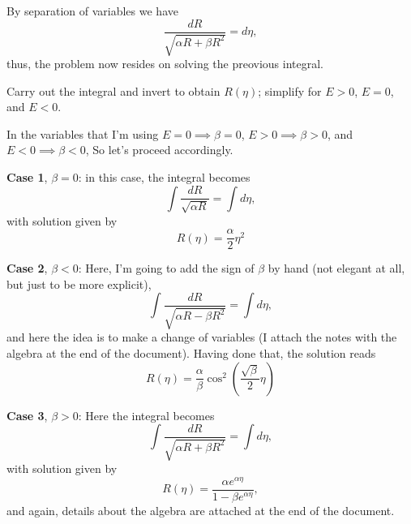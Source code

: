 \documentclass[11pt]{article}
\begin{document}
\begin{solution}
	By separation of variables we have
\begin{displaymath}
  \frac{dR}{\sqrt{\alpha R+\beta R^2}} = d\eta,
\end{displaymath}
thus, the problem now resides on solving the preovious integral.
	
\end{solution}

\pagebreak
\begin{problem}
	Carry out the integral and invert to obtain $R(\eta)$; simplify for $E > 0$, $E = 0$, and $E < 0$.
\end{problem}

\begin{solution}
In the variables that I'm using $E = 0\implies \beta=0$, $E>0\implies \beta>0$, and $E<0\implies \beta<0$, So let's proceed accordingly.

\textbf{Case 1}, $\beta = 0$: in this case, the integral becomes 
\begin{displaymath}
  \int \frac{dR}{\sqrt{\alpha R }} = \int d\eta,
\end{displaymath}
with solution given by
\begin{displaymath}
  R(\eta) = \frac{\alpha}{2}\eta^2
\end{displaymath}

\textbf{Case 2}, $\beta < 0 $: Here, I'm going to add the sign of $\beta$ by hand (not elegant at all, but just to be more explicit),
\begin{displaymath}
    \int \frac{dR}{\sqrt{\alpha R-\beta R^2}} = \int d\eta,
\end{displaymath}
and here the idea is to make a change of variables (I attach the notes with the algebra at the end of the document). Having done that, the solution reads
\begin{displaymath}
  R(\eta) = \frac{\alpha}{\beta} \cos^2\left( \frac{\sqrt{\beta}}{2}\eta \right)
\end{displaymath}

\textbf{Case 3}, $\beta > 0 $:  Here the integral becomes
\begin{displaymath}
  \int \frac{dR}{\sqrt{\alpha R+\beta R^2}} = \int d\eta,
\end{displaymath}
with solution given by
\begin{displaymath}
  R(\eta) = \frac{\alpha e^{\alpha\eta}}{1-\beta e^{\alpha\eta}},
\end{displaymath}
and again, details about the algebra are attached at the end of the document.

\end{solution}
\end{document}
